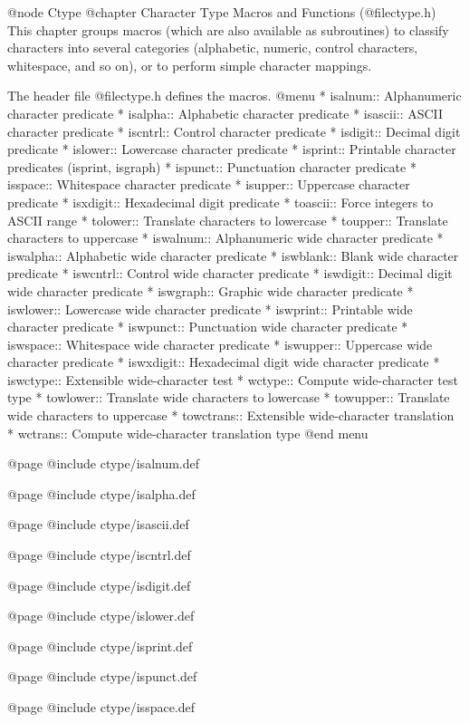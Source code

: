 @node Ctype
@chapter Character Type Macros and Functions (@file{ctype.h})
This chapter groups macros (which are also available as subroutines)
to classify characters into several categories (alphabetic,
numeric, control characters, whitespace, and so on), or to perform
simple character mappings.

The header file @file{ctype.h} defines the macros.
@menu 
* isalnum::   Alphanumeric character predicate
* isalpha::   Alphabetic character predicate
* isascii::   ASCII character predicate
* iscntrl::   Control character predicate
* isdigit::   Decimal digit predicate
* islower::   Lowercase character predicate
* isprint::   Printable character predicates (isprint, isgraph)
* ispunct::   Punctuation character predicate
* isspace::   Whitespace character predicate
* isupper::   Uppercase character predicate
* isxdigit::  Hexadecimal digit predicate
* toascii::   Force integers to ASCII range
* tolower::   Translate characters to lowercase
* toupper::   Translate characters to uppercase
* iswalnum::  Alphanumeric wide character predicate
* iswalpha::  Alphabetic wide character predicate
* iswblank::  Blank wide character predicate
* iswcntrl::  Control wide character predicate
* iswdigit::  Decimal digit wide character predicate
* iswgraph::  Graphic wide character predicate
* iswlower::  Lowercase wide character predicate
* iswprint::  Printable wide character predicate
* iswpunct::  Punctuation wide character predicate
* iswspace::  Whitespace wide character predicate
* iswupper::  Uppercase wide character predicate
* iswxdigit:: Hexadecimal digit wide character predicate
* iswctype::  Extensible wide-character test
* wctype::    Compute wide-character test type
* towlower::  Translate wide characters to lowercase
* towupper::  Translate wide characters to uppercase
* towctrans:: Extensible wide-character translation
* wctrans::   Compute wide-character translation type
@end menu

@page
@include ctype/isalnum.def

@page
@include ctype/isalpha.def

@page
@include ctype/isascii.def

@page
@include ctype/iscntrl.def

@page
@include ctype/isdigit.def

@page
@include ctype/islower.def

@page
@include ctype/isprint.def

@page
@include ctype/ispunct.def

@page
@include ctype/isspace.def


